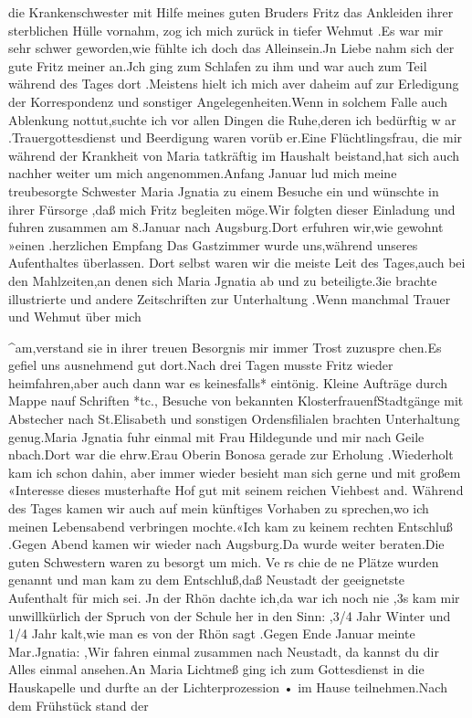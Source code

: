 \documentclass[a4paper,11pt]{article}
\begin{document}
die Krankenschwester mit Hilfe meines guten Bruders Fritz das Ankleiden ihrer sterblichen Hülle vornahm, zog ich mich zurück in tiefer Wehmut .Es war mir sehr schwer geworden,wie fühlte ich doch das Alleinsein.Jn Liebe nahm sich der gute Fritz meiner an.Jch ging zum Schlafen zu ihm und war auch zum Teil während des Tages dort .Meistens hielt ich mich aver daheim auf zur Erledigung der Korrespondenz und sonstiger Angelegenheiten.Wenn in solchem Falle auch Ablenkung nottut,suchte ich vor allen Dingen die Ruhe,deren ich bedürftig w ar .Trauergottesdienst und Beerdigung waren vorüb er.Eine Flüchtlingsfrau, die mir während der Krankheit von Maria tatkräftig im Haushalt beistand,hat sich auch nachher weiter um mich angenommen.Anfang Januar lud mich meine treubesorgte Schwester Maria Jgnatia zu einem Besuche ein und wünschte in ihrer Fürsorge ,daß mich Fritz begleiten möge.Wir folgten dieser Einladung und fuhren zusammen am 8.Januar nach Augsburg.Dort erfuhren wir,wie gewohnt »einen .herzlichen Empfang Das Gastzimmer wurde uns,während unseres Aufenthaltes überlassen. Dort selbst waren wir die meiste Leit des Tages,auch bei den Mahlzeiten,an denen sich Maria Jgnatia ab und zu beteiligte.3ie brachte illustrierte und andere Zeitschriften zur Unterhaltung .Wenn manchmal Trauer und Wehmut über mich

^am,verstand sie in ihrer treuen Besorgnis mir immer Trost zuzuspre chen.Es gefiel uns ausnehmend gut dort.Nach drei Tagen musste Fritz wieder heimfahren,aber auch dann war es keinesfalls* eintönig. Kleine Aufträge durch Mappe nauf Schriften *tc., Besuche von bekannten KlosterfrauenfStadtgänge mit Abstecher nach St.Elisabeth und sonstigen Ordensfilialen brachten Unterhaltung genug.Maria Jgnatia fuhr einmal mit Frau Hildegunde und mir nach Geile nbach.Dort war die ehrw.Erau Oberin Bonosa gerade zur Erholung .Wiederholt kam ich schon dahin, aber immer wieder besieht man sich gerne und mit großem «Interesse dieses musterhafte Hof gut mit seinem reichen Viehbest and. Während des Tages kamen wir auch auf mein künftiges Vorhaben zu sprechen,wo ich meinen Lebensabend verbringen mochte.«Ich kam zu keinem rechten Entschluß .Gegen Abend kamen wir wieder nach Augsburg.Da wurde weiter beraten.Die guten Schwestern waren zu besorgt um mich. Ve rs chie de ne Plätze wurden genannt und man kam zu dem Entschluß,daß Neustadt der geeignetste Aufenthalt für mich sei. Jn der Rhön dachte ich,da war ich noch nie ,3s kam mir unwillkürlich der Spruch von der Schule her in den Sinn: ,3/4 Jahr Winter und 1/4 Jahr kalt,wie man es von der Rhön sagt .Gegen Ende Januar meinte Mar.Jgnatia: ,Wir fahren einmal zusammen nach Neustadt, da kannst du dir Alles einmal ansehen.An Maria Lichtmeß ging ich zum Gottesdienst in die Hauskapelle und durfte an der Lichterprozession • im Hause teilnehmen.Nach dem Frühstück stand der
\end{document}
